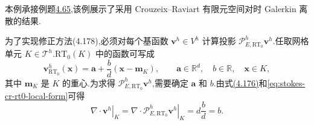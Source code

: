 \begin{example}
\label{ex:stokes-pressure-robust-scaled-analytic}
本例承接例题\hyperref[ex:stokes-scaled-analytic-lowest-order]{4.65},该例展示了采用 Crouzeix--Raviart 有限元空间对时 Galerkin 离散的结果.

为了实现修正方法(4.178),必须对每个基函数 $\bm{v}^h\in V^h$ 计算投影 $\mathcal{P}_{E,\mathrm{RT}_0}^h\bm{v}^h$.任取网格单元 $K\in\mathcal{T}^h$.$\mathrm{RT}_0(K)$ 中的函数可写成
\begin{equation}\label{eq:stokes-cr-rt0-local-form}
  \bm{v}_{\mathrm{RT}_0}^h(\bm{x})
  =\bm{a}+\frac{b}{d}(\bm{x}-\bm{m}_K),
  \qquad \bm{a}\in\mathbb{R}^d,\quad b\in\mathbb{R},\quad \bm{x}\in K,
\end{equation}
其中 $\bm{m}_K$ 是 $K$ 的重心.为求得 $\mathcal{P}_{E,\mathrm{RT}_0}^h\bm{v}^h$,需要确定 $\bm{a}$ 和 $b$.由式\hyperref[eq:stokes-cr-projection-divergence-rt0]{(4.176)}和\cref{eq:stokes-cr-rt0-local-form}可得
\[
  \left.\nabla\cdot\bm{v}^h\right|_K
  =\left.\nabla\cdot\mathcal{P}_{E,\mathrm{RT}_0}^h\bm{v}^h\right|_K
  =d\frac{b}{d}=b.
\]


\end{example}
